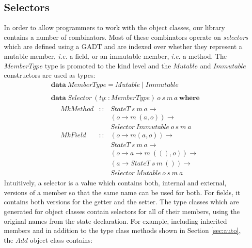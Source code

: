 \subsection{Selectors}

In order to allow programmers to work with the object classes, our library contains a number of combinators. Most of these combinators operate on \emph{selectors} which are defined using a GADT and are indexed over whether they represent a mutable member, \emph{i.e.} a field, or an immutable member, \emph{i.e.} a method. The $\mathit{MemberType}$ type is promoted to the kind level and the $\mathit{Mutable}$ and $\mathit{Immutable}$ constructors are used as types:
\begin{displaymath}
\begin{array}{l}
\mathbf{data}~\mathit{MemberType} = \mathit{Mutable} \mid \mathit{Immutable} \\\\
\mathbf{data}~\mathit{Selector}~(\mathit{ty} :: \mathit{MemberType})~o~s~m~a~\mathbf{where} \\
\quad \begin{array}{lcl}
 \mathit{MkMethod} & :: & \mathit{StateT}~s~m~a \to \\
                   &    & (o \to m~(a, o)) \to\\
                   &    & \mathit{Selector}~\mathit{Immutable}~o~s~m~a \\
\mathit{MkField}   & :: & (o \to m (a,o)) \to \\
                   &    & \mathit{StateT}~s~m~a \to \\
                   &    & (o \to a \to m~((),o)) \to \\
                   &    & (a \to \mathit{StateT}~s~m~()) \to \\
                   &    & \mathit{Selector}~\mathit{Mutable}~o~s~m~a
\end{array}
\end{array}
\end{displaymath}
Intuitively, a selector is a value which contains both, internal and external, versions of a member so that the same name can be used for both. For fields, it contains both versions for the getter and the setter. 
The type classes which are generated for object classes contain selectors for all of their members, using the original names from the state declaration. For example, including inherited members and in addition to the type class methods shown in Section \ref{sec:auto}, the $\mathit{Add}$ object class contains:
